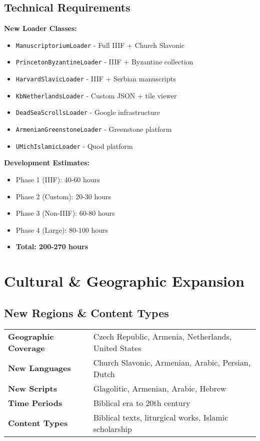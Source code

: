 \documentclass[11pt,a4paper]{article}
\begin{document}
\subsection{Technical Requirements}

\textbf{New Loader Classes:}
\begin{itemize}[leftmargin=*]
    \item \texttt{ManuscriptoriumLoader} - Full IIIF + Church Slavonic
    \item \texttt{PrincetonByzantineLoader} - IIIF + Byzantine collection  
    \item \texttt{HarvardSlavicLoader} - IIIF + Serbian manuscripts
    \item \texttt{KbNetherlandsLoader} - Custom JSON + tile viewer
    \item \texttt{DeadSeaScrollsLoader} - Google infrastructure
    \item \texttt{ArmenianGreenstoneLoader} - Greenstone platform
    \item \texttt{UMichIslamicLoader} - Quod platform
\end{itemize}

\textbf{Development Estimates:}
\begin{itemize}[leftmargin=*]
    \item Phase 1 (IIIF): 40-60 hours
    \item Phase 2 (Custom): 20-30 hours  
    \item Phase 3 (Non-IIIF): 60-80 hours
    \item Phase 4 (Large): 80-100 hours
    \item \textbf{Total: 200-270 hours}
\end{itemize}

\section{Cultural \& Geographic Expansion}

\subsection{New Regions \& Content Types}

\begin{tabularx}{\textwidth}{lX}
\toprule
\textbf{Geographic Coverage} & Czech Republic, Armenia, Netherlands, United States \\
\textbf{New Languages} & Church Slavonic, Armenian, Arabic, Persian, Dutch \\
\textbf{New Scripts} & Glagolitic, Armenian, Arabic, Hebrew \\
\textbf{Time Periods} & Biblical era to 20th century \\
\textbf{Content Types} & Biblical texts, liturgical works, Islamic scholarship \\
\bottomrule
\end{tabularx}
\end{document}
